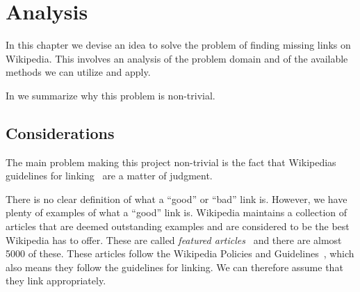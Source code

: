 \chapter{Analysis}\label{chap:idea}
In this chapter we devise an idea to solve the problem of finding missing links on Wikipedia. This involves an analysis of the problem domain and of the available methods we can utilize and apply.

\begin{chapterorganization}
  \item In  we summarize why this problem is non-trivial.
 
\end{chapterorganization}

\section{Considerations}\label{sec:analconsiderations}
The main problem making this project non-trivial is the fact that Wikipedias guidelines for linking~\cite{wiki-manual-of-style-overlinking} are a matter of judgment. 

There is no clear definition of what a ``good'' or ``bad'' link is. However, we have plenty of examples of what a ``good'' link is.
Wikipedia maintains a collection of articles that are deemed outstanding examples and are considered to be the best Wikipedia has to offer. These are called \emph{featured articles}~\cite{wiki-featured-articles} and there are almost 5000 of these. These articles follow the Wikipedia Policies and Guidelines~\cite{wiki-editor-guidelines}, which also means they follow the guidelines for linking. We can therefore assume that they link appropriately.






